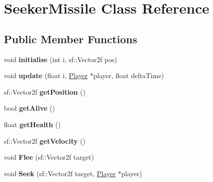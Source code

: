 \hypertarget{class_seeker_missile}{}\section{Seeker\+Missile Class Reference}
\label{class_seeker_missile}
\subsection*{Public Member Functions}
\begin{DoxyCompactItemize}
\item 
\mbox{\label{class_seeker_missile_a09c20c51520a2ee6c3282d7284ec1528}} 
void {\bfseries initialise} (int i, sf\+::\+Vector2f pos)
\item 
\mbox{\label{class_seeker_missile_af3baaea8b9680a9acb037a1596d9403b}} 
void {\bfseries update} (float i, \mbox{\hyperlink{class_player}{Player}} $\ast$player, float delta\+Time)
\item 
\mbox{\label{class_seeker_missile_aec565a6d030044f0b96b6b9e599aff80}} 
sf\+::\+Vector2f {\bfseries get\+Position} ()
\item 
\mbox{\label{class_seeker_missile_ae60ac129a3cc0810b98e8284b3d622af}} 
bool {\bfseries get\+Alive} ()
\item 
\mbox{\label{class_seeker_missile_a34ee6daa06745c921bc27e13e0ac8150}} 
float {\bfseries get\+Health} ()
\item 
\mbox{\label{class_seeker_missile_a21ff15f78ec3ceb191735b13b2f86aeb}} 
sf\+::\+Vector2f {\bfseries get\+Velocity} ()
\item 
\mbox{\label{class_seeker_missile_aaead4b6d7f967a6a7de3b53a4b5b425a}} 
void {\bfseries Flee} (sf\+::\+Vector2f target)
\item 
\mbox{\label{class_seeker_missile_a1fe0f447573c340c2a11c0313ebf9ea2}} 
void {\bfseries Seek} (sf\+::\+Vector2f target, \mbox{\hyperlink{class_player}{Player}} $\ast$player)
\item 
\mbox{\label{class_seeker_missile_a0cf52290284abf389c795efc9a1db3d1}} 

\end{DoxyCompactItemize}
